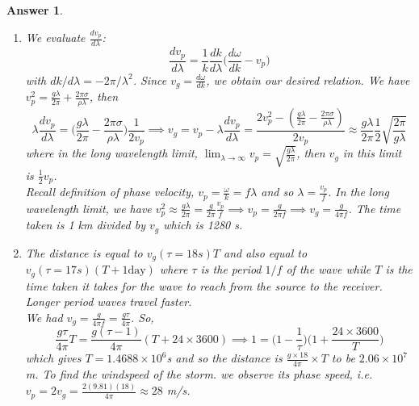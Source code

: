 \documentclass[a4paper]{article}
\newtheorem{ans}{Answer}[section]
\theoremstyle{new}
\begin{document}
\begin{ans}\leavevmode
\begin{enumerate}[label=(\alph*)]
\item We evaluate $\frac{dv_p}{d\lambda}$:
$$\frac{dv_p}{d\lambda}=\frac{1}{k}\frac{dk}{d\lambda}\bigg(\frac{d\omega}{dk}-v_p\bigg)$$
with $dk/d\lambda=-2\pi/\lambda^2$. Since $v_g=\frac{d\omega}{dk}$, we obtain our desired relation. We have $v_p^2=\frac{g\lambda}{2\pi}+\frac{2\pi\sigma}{\rho\lambda}$, then
$$\lambda\frac{dv_p}{d\lambda}=\bigg(\frac{g\lambda}{2\pi}-\frac{2\pi\sigma}{\rho\lambda}\bigg)\frac{1}{2v_p}\implies v_g=v_p-\lambda\frac{dv_p}{d\lambda}=\frac{2v_p^2-(\frac{g\lambda}{2\pi}-\frac{2\pi\sigma}{\rho\lambda})}{2v_p}\approx\frac{g\lambda}{2\pi}\frac{1}{2}\sqrt{\frac{2\pi}{g\lambda}}$$
where in the long wavelength limit, $\lim_{\lambda\rightarrow\infty}v_p=\sqrt{\frac{g\lambda}{2\pi}}$, then $v_g$ in this limit is $\frac{1}{2}v_p$.\\[5pt]
Recall definition of phase velocity, $v_p=\frac{\omega}{k}=f\lambda$ and so $\lambda=\frac{v_p}{f}$. In the long wavelength limit, we have $v_p^2\approx\frac{g\lambda}{2\pi}=\frac{g}{2\pi}\frac{v_p}{f}\implies v_p=\frac{g}{2\pi f}\implies v_g=\frac{g}{4\pi f}$. The time taken is 1 km divided by $v_g$ which is 1280 s.
\item The distance is equal to $v_g(\tau=18s)T$ and also equal to $v_g(\tau=17s)(T+1\text{day})$ where $\tau$ is the period $1/f$ of the wave while $T$ is the time taken it takes for the wave to reach from the source to the receiver. Longer period waves travel faster.\\[5pt]
We had $v_g=\frac{g}{4\pi f}=\frac{g\tau}{4\pi}$. So,
$$\frac{g\tau}{4\pi}T=\frac{g(\tau-1)}{4\pi}(T+24\times 3600)\implies 1=\bigg(1-\frac{1}{\tau}\bigg)\bigg(1+\frac{24\times 3600}{T}\bigg)$$
which gives $T=1.4688\times10^6$s and so the distance is $\frac{g\times 18}{4\pi}\times T$ to be $2.06\times10^7$ m. To find the windspeed of the storm. we observe its phase speed, i.e. $v_p=2v_g=\frac{2(9.81)(18)}{4\pi}\approx28$ m/s.
\end{enumerate}
\end{ans}
\newpage
\end{document}
